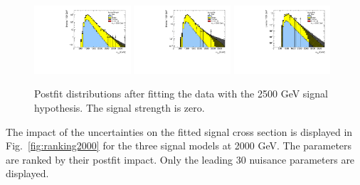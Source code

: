 \begin{figure}[htbp!]
\begin{center}
\includegraphics[width=0.32\textwidth,angle=-90]{figures/boosted/results/postfitplot_s_2500_b2b.pdf} 
\includegraphics[width=0.32\textwidth,angle=-90]{figures/boosted/results/postfitplot_s_2500_b3b.pdf} 
\includegraphics[width=0.32\textwidth,angle=-90]{figures/boosted/results/postfitplot_s_2500_b4b.pdf} 
\caption{Postfit distributions after fitting the data with the 2500 GeV signal hypothesis. The signal strength is zero.}
\label{fig:postfit2500}
\end{center}
\end{figure}

The impact of the uncertainties on the fitted signal cross section is displayed in Fig.~\ref{fig:ranking2000} for the three signal models at 2000 GeV. The parameters are ranked by their postfit impact. Only the leading 30 nuisance parameters are displayed.

